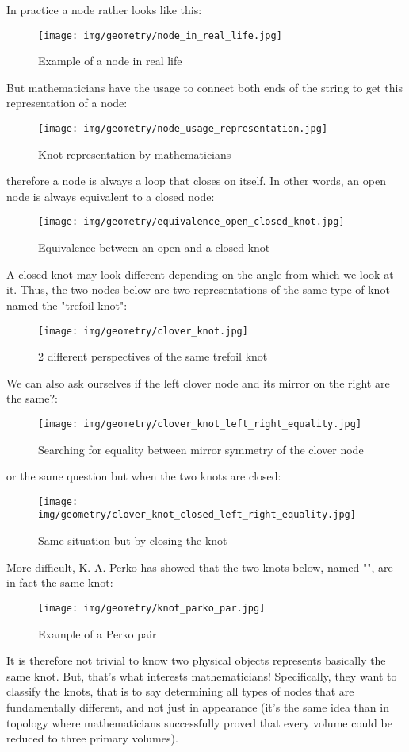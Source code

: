 {	In practice a node rather looks like this:
	\begin{figure}[H]
		\centering
		\texttt{[image: img/geometry/node\_in\_real\_life.jpg]}
		\caption{Example of a node in real life}
	\end{figure}
	But mathematicians have the usage to connect both ends of the string to get this representation of a node:
	\begin{figure}[H]
		\centering
		\texttt{[image: img/geometry/node\_usage\_representation.jpg]}
		\caption{Knot representation by mathematicians}
	\end{figure}
	therefore a node is always a loop that closes on itself. In other words, an open node is always equivalent to a closed node:
	\begin{figure}[H]
		\centering
		\texttt{[image: img/geometry/equivalence\_open\_closed\_knot.jpg]}
		\caption{Equivalence between an open and a closed knot}
	\end{figure}
	A closed knot may look different depending on the angle from which we look at it. Thus, the two nodes below are two representations of the same type of knot named the "trefoil knot":
	\begin{figure}[H]
		\centering
		\texttt{[image: img/geometry/clover\_knot.jpg]}
		\caption{2 different perspectives of the same trefoil knot}
	\end{figure}
	We can also ask ourselves if the left clover node and its mirror on the right are the same?:
	\begin{figure}[H]
		\centering
		\texttt{[image: img/geometry/clover\_knot\_left\_right\_equality.jpg]}
		\caption{Searching for equality between mirror symmetry of the clover node}
	\end{figure}
	or the same question but when the two knots are closed:
	\begin{figure}[H]
		\centering
		\texttt{[image: img/geometry/clover\_knot\_closed\_left\_right\_equality.jpg]}
		\caption[]{Same situation but by closing the knot}
	\end{figure}
	More difficult, K. A. Perko has showed that the two knots below, named "", are in fact the same knot:
	\begin{figure}[H]
		\centering
		\texttt{[image: img/geometry/knot\_parko\_par.jpg]}
		\caption{Example of a Perko pair}
	\end{figure}
	It is therefore not trivial to know two physical objects represents basically the same knot. But, that's what interests mathematicians! Specifically, they want to classify the knots, that is to say determining all types of nodes that are fundamentally different, and not just in appearance (it's the same idea than in topology where mathematicians successfully proved that every volume could be reduced to three primary volumes).
	
}
